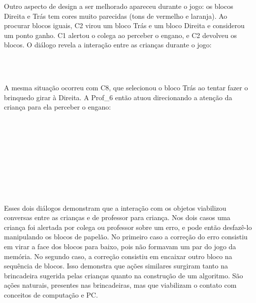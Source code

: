 Outro aspecto de design a ser melhorado apareceu durante o jogo: os blocos Direita e Trás tem cores muito parecidas (tons de vermelho e laranja). Ao procurar blocos iguais, C2 virou um bloco Trás e um bloco Direita e considerou um ponto ganho. C1 alertou o colega ao perceber o engano, e C2 devolveu os blocos. O diálogo revela a interação entre as crianças durante o jogo:

\begin{dialogo}
     \\
     \\ 
\end{dialogo}

A mesma situação ocorreu com C8, que selecionou o bloco Trás ao tentar fazer o brinquedo girar à Direita. A Prof\_6 então atuou direcionando a atenção da criança para ela perceber o engano:

\begin{dialogo}
     \\
     \\
     \\
      \\
     \\
      \\
     \\
      \\
\end{dialogo}

Esses dois diálogos demonstram que a interação com os objetos viabilizou conversas entre as crianças e de professor para criança. Nos dois casos uma criança foi alertada por colega ou professor sobre um erro, e pode então desfazê-lo manipulando os blocos de papelão. No primeiro caso a correção do erro consistiu em virar a face dos blocos para baixo, pois não formavam um par do jogo da memória. No segundo caso, a correção consistiu em encaixar outro bloco na sequência de blocos. Isso demonstra que ações similares surgiram tanto na brincadeira sugerida pelas crianças quanto na construção de um algoritmo. São ações naturais, presentes nas brincadeiras, mas que viabilizam o contato com conceitos de computação e \ac{PC}.

